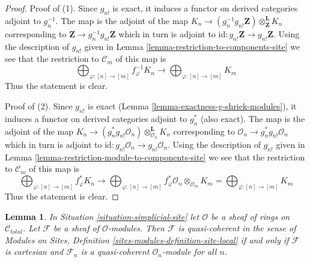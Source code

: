 \documentclass{stacks-project}
\theoremstyle{plain}
\newtheorem{lemma}[subsection]{Lemma}
\theoremstyle{definition}
\theoremstyle{remark}
\numberwithin{equation}{subsection}
\begin{document}
\begin{proof}
Proof of (1). Since $g_{n!}$ is exact, it induces a functor
on derived categories adjoint to $g_n^{-1}$.
The map is the adjoint of the map
$K_n \to (g_n^{-1}g_{n!}\mathbf{Z}) \otimes^\mathbf{L}_\mathbf{Z} K_n$
corresponding to $\mathbf{Z} \to g_n^{-1}g_{n!}\mathbf{Z}$
which in turn is adjoint to
$\text{id} : g_{n!}\mathbf{Z} \to g_{n!}\mathbf{Z}$.
Using the description of $g_{n!}$
given in Lemma \ref{lemma-restriction-to-components-site}
we see that the restriction to $\mathcal{C}_m$ of this map
is
$$
\bigoplus\nolimits_{\varphi : [n] \to [m]} f_\varphi^{-1}K_n
\longrightarrow
\bigoplus\nolimits_{\varphi : [n] \to [m]} K_m
$$
Thus the statement is clear.

\medskip\noindent
Proof of (2). Since $g_{n!}$ is exact
(Lemma \ref{lemma-exactness-g-shriek-modules}), it induces a functor
on derived categories adjoint to $g_n^*$ (also exact).
The map is the adjoint of the map
$K_n \to (g_n^*g_{n!}\mathcal{O}_n) \otimes^\mathbf{L}_{\mathcal{O}_n} K_n$
corresponding to $\mathcal{O}_n \to g_n^*g_{n!}\mathcal{O}_n$
which in turn is adjoint to
$\text{id} : g_{n!}\mathcal{O}_n \to g_{n!}\mathcal{O}_n$.
Using the description of $g_{n!}$
given in Lemma \ref{lemma-restriction-module-to-components-site}
we see that the restriction to $\mathcal{C}_m$ of this map
is
$$
\bigoplus\nolimits_{\varphi : [n] \to [m]} f_\varphi^*K_n
\longrightarrow
\bigoplus\nolimits_{\varphi : [n] \to [m]}
f_\varphi^*\mathcal{O}_n \otimes_{\mathcal{O}_m} K_m =
\bigoplus\nolimits_{\varphi : [n] \to [m]} K_m
$$
Thus the statement is clear.
\end{proof}

\begin{lemma}
\label{lemma-quasi-coherent-sheaf}
In Situation \ref{situation-simplicial-site}
let $\mathcal{O}$ be a sheaf of rings on $\mathcal{C}_{total}$.
Let $\mathcal{F}$ be a sheaf of $\mathcal{O}$-modules.
Then $\mathcal{F}$ is quasi-coherent in the sense of
Modules on Sites, Definition \ref{sites-modules-definition-site-local}
if and only if $\mathcal{F}$ is cartesian
and $\mathcal{F}_n$ is a quasi-coherent $\mathcal{O}_n$-module for all $n$.
\end{lemma}
\end{document}

